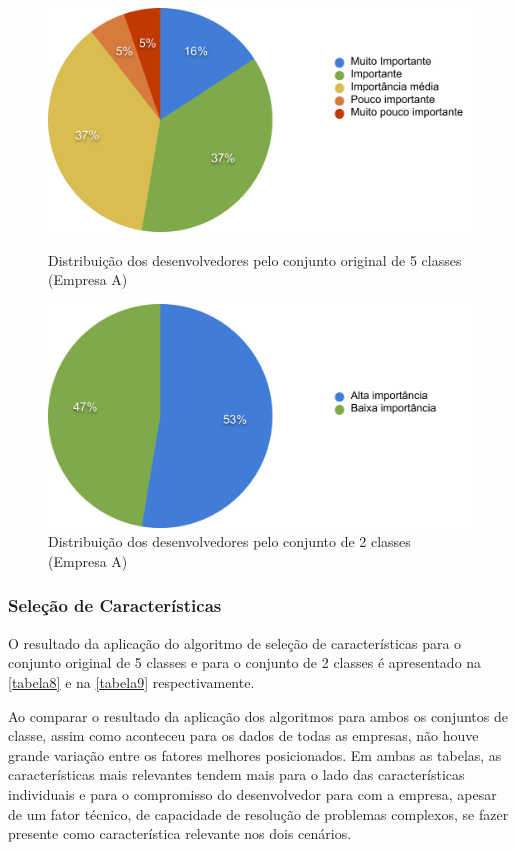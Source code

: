 \begin{figure}[h]
	\centering
	\includegraphics[scale=0.45]{figs/empresa_a/imagem-classe-original}
	\caption{\label{fig_7}Distribuição dos desenvolvedores pelo conjunto original de 5 classes (Empresa A)}
	\vspace{20pt}
	\includegraphics[scale=0.45]{figs/empresa_a/imagem-classe-alternativa}
	\caption{\label{fig_8}Distribuição dos desenvolvedores pelo conjunto de 2 classes (Empresa A)}
\end{figure}

\subsubsection{Seleção de Características}
O resultado da aplicação do algoritmo de seleção de características para o conjunto original de 5 classes e para o conjunto de 2 classes é apresentado na \autoref{tabela8} e na \autoref{tabela9} respectivamente.

Ao comparar o resultado da aplicação dos algoritmos para ambos os conjuntos de classe, assim como aconteceu para os dados de todas as empresas, não houve grande variação entre os fatores melhores posicionados. Em ambas as tabelas, as características mais relevantes tendem mais para o lado das características individuais e para o compromisso do desenvolvedor para com a empresa, apesar de um fator técnico, de capacidade de resolução de problemas complexos, se fazer presente como característica relevante nos dois cenários.


